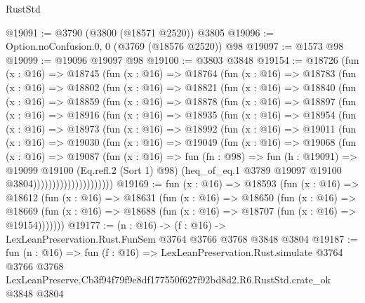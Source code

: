 \begin{lexlean}{RustStd}
\begin{coremodule}
@19091 := @3790 (@3800 (@18571 @2520)) @3805
@19096 := Option.noConfusion.{0, 0} (@3769 (@18576 @2520)) @98
@19097 := @1573 @98
@19099 := @19096 @19097 @98
@19100 := @3803 @3848
@19154 := @18726
    (fun (x : @16) =>
    @18745
      (fun (x : @16) =>
      @18764
        (fun (x : @16) =>
        @18783
          (fun (x : @16) =>
          @18802
            (fun (x : @16) =>
            @18821
              (fun (x : @16) =>
              @18840
                (fun (x : @16) =>
                @18859
                  (fun (x : @16) =>
                  @18878
                    (fun (x : @16) =>
                    @18897
                      (fun (x : @16) =>
                      @18916
                        (fun (x : @16) =>
                        @18935
                          (fun (x : @16) =>
                          @18954
                            (fun (x : @16) =>
                            @18973
                              (fun (x : @16) =>
                              @18992
                                (fun (x : @16) =>
                                @19011
                                  (fun (x : @16) =>
                                  @19030
                                    (fun (x : @16) =>
                                    @19049
                                      (fun (x : @16) =>
                                      @19068
                                        (fun (x : @16) =>
                                        @19087
                                          (fun (x : @16) =>
                                          fun (fn : @98) =>
                                          fun (h : @19091) =>
                                          @19099
                                            @19100
                                            (Eq.refl.{2} (Sort 1) @98)
                                            (heq_of_eq.{1}
                                              @3789
                                              @19097
                                              @19100
                                              @3804)))))))))))))))))))))
@19169 := fun (x : @16) =>
  @18593
    (fun (x : @16) =>
    @18612
      (fun (x : @16) =>
      @18631
        (fun (x : @16) =>
        @18650
          (fun (x : @16) =>
          @18669 (fun (x : @16) => @18688 (fun (x : @16) => @18707 (fun (x : @16) => @19154)))))))
@19177 := (n : @16) -> (f : @16) -> LexLeanPreservation.Rust.FunSem @3764 @3766 @3768 @3848 @3804
@19187 := fun (n : @16) =>
  fun (f : @16) =>
  LexLeanPreservation.Rust.simulate
    @3764
    @3766
    @3768
    LexLeanPreserve.Cb3f94f79f9e8df177550f627f92bd8d2.R6.RustStd.crate_ok
    @3848
    @3804
\end{coremodule}
\end{lexlean}
